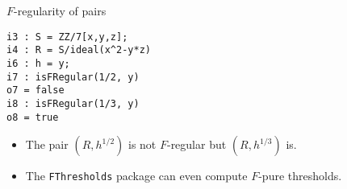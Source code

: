 \documentclass[xcolor=dvipsnames]{beamer}
\theoremstyle{remark}
\begin{document}
\begin{frame}[fragile]{$F$-regularity of pairs}
    \begin{verbatim}
i3 : S = ZZ/7[x,y,z];
i4 : R = S/ideal(x^2-y*z)
i6 : h = y;
i7 : isFRegular(1/2, y)
o7 = false
i8 : isFRegular(1/3, y)
o8 = true
    \end{verbatim}
    \begin{itemize}
\item<2->The pair $(R, h^{1/2})$ is not $F$-regular but $(R, h^{1/3})$ is.
\item<3->The {\tt FThresholds} package can even compute $F$-pure thresholds.
\end{itemize}
\end{frame}
\end{document}
